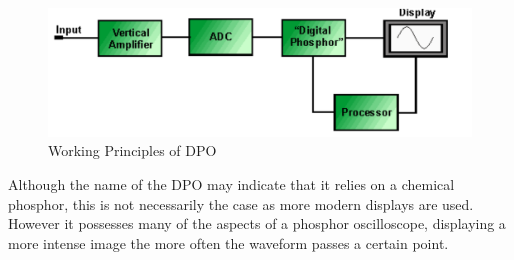 
\begin{figure}[H]
	\center
	\setlength{\unitlength}{\textwidth} 
	\includegraphics[width=1.0\unitlength]{dpo}
	\caption{\label{fig:dpo}Working Principles of DPO }
\end{figure}


	Although the name of the DPO may indicate that it relies on a chemical phosphor, this is not necessarily the case as more modern displays are used. However it possesses many of the aspects of a phosphor oscilloscope, displaying a more intense image the more often the waveform passes a certain point.


